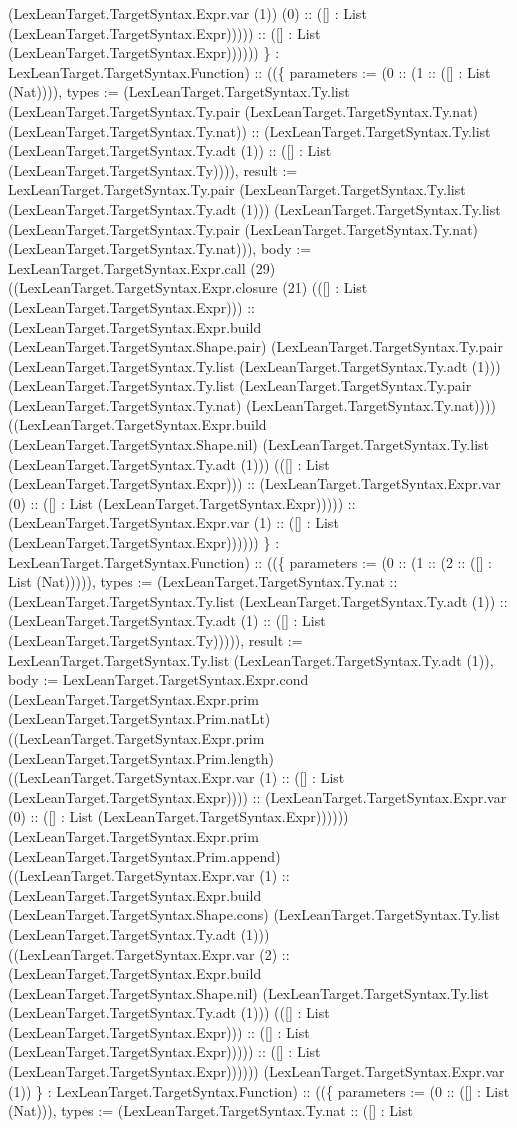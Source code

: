 \documentclass[11pt]{article}
\begin{document}
(LexLeanTarget.TargetSyntax.Expr.var (1)) (0) :: ([] : List (LexLeanTarget.TargetSyntax.Expr))))) :: ([] : List (LexLeanTarget.TargetSyntax.Expr)))))) \} : LexLeanTarget.TargetSyntax.Function) :: ((\{ parameters := (0 :: (1 :: ([] : List (Nat)))), types := (LexLeanTarget.TargetSyntax.Ty.list (LexLeanTarget.TargetSyntax.Ty.pair (LexLeanTarget.TargetSyntax.Ty.nat) (LexLeanTarget.TargetSyntax.Ty.nat)) :: (LexLeanTarget.TargetSyntax.Ty.list (LexLeanTarget.TargetSyntax.Ty.adt (1)) :: ([] : List (LexLeanTarget.TargetSyntax.Ty)))), result := LexLeanTarget.TargetSyntax.Ty.pair (LexLeanTarget.TargetSyntax.Ty.list (LexLeanTarget.TargetSyntax.Ty.adt (1))) (LexLeanTarget.TargetSyntax.Ty.list (LexLeanTarget.TargetSyntax.Ty.pair (LexLeanTarget.TargetSyntax.Ty.nat) (LexLeanTarget.TargetSyntax.Ty.nat))), body := LexLeanTarget.TargetSyntax.Expr.call (29) ((LexLeanTarget.TargetSyntax.Expr.closure (21) (([] : List (LexLeanTarget.TargetSyntax.Expr))) :: (LexLeanTarget.TargetSyntax.Expr.build (LexLeanTarget.TargetSyntax.Shape.pair) (LexLeanTarget.TargetSyntax.Ty.pair (LexLeanTarget.TargetSyntax.Ty.list (LexLeanTarget.TargetSyntax.Ty.adt (1))) (LexLeanTarget.TargetSyntax.Ty.list (LexLeanTarget.TargetSyntax.Ty.pair (LexLeanTarget.TargetSyntax.Ty.nat) (LexLeanTarget.TargetSyntax.Ty.nat)))) ((LexLeanTarget.TargetSyntax.Expr.build (LexLeanTarget.TargetSyntax.Shape.nil) (LexLeanTarget.TargetSyntax.Ty.list (LexLeanTarget.TargetSyntax.Ty.adt (1))) (([] : List (LexLeanTarget.TargetSyntax.Expr))) :: (LexLeanTarget.TargetSyntax.Expr.var (0) :: ([] : List (LexLeanTarget.TargetSyntax.Expr))))) :: (LexLeanTarget.TargetSyntax.Expr.var (1) :: ([] : List (LexLeanTarget.TargetSyntax.Expr)))))) \} : LexLeanTarget.TargetSyntax.Function) :: ((\{ parameters := (0 :: (1 :: (2 :: ([] : List (Nat))))), types := (LexLeanTarget.TargetSyntax.Ty.nat :: (LexLeanTarget.TargetSyntax.Ty.list (LexLeanTarget.TargetSyntax.Ty.adt (1)) :: (LexLeanTarget.TargetSyntax.Ty.adt (1) :: ([] : List (LexLeanTarget.TargetSyntax.Ty))))), result := LexLeanTarget.TargetSyntax.Ty.list (LexLeanTarget.TargetSyntax.Ty.adt (1)), body := LexLeanTarget.TargetSyntax.Expr.cond (LexLeanTarget.TargetSyntax.Expr.prim (LexLeanTarget.TargetSyntax.Prim.natLt) ((LexLeanTarget.TargetSyntax.Expr.prim (LexLeanTarget.TargetSyntax.Prim.length) ((LexLeanTarget.TargetSyntax.Expr.var (1) :: ([] : List (LexLeanTarget.TargetSyntax.Expr)))) :: (LexLeanTarget.TargetSyntax.Expr.var (0) :: ([] : List (LexLeanTarget.TargetSyntax.Expr)))))) (LexLeanTarget.TargetSyntax.Expr.prim (LexLeanTarget.TargetSyntax.Prim.append) ((LexLeanTarget.TargetSyntax.Expr.var (1) :: (LexLeanTarget.TargetSyntax.Expr.build (LexLeanTarget.TargetSyntax.Shape.cons) (LexLeanTarget.TargetSyntax.Ty.list (LexLeanTarget.TargetSyntax.Ty.adt (1))) ((LexLeanTarget.TargetSyntax.Expr.var (2) :: (LexLeanTarget.TargetSyntax.Expr.build (LexLeanTarget.TargetSyntax.Shape.nil) (LexLeanTarget.TargetSyntax.Ty.list (LexLeanTarget.TargetSyntax.Ty.adt (1))) (([] : List (LexLeanTarget.TargetSyntax.Expr))) :: ([] : List (LexLeanTarget.TargetSyntax.Expr))))) :: ([] : List (LexLeanTarget.TargetSyntax.Expr)))))) (LexLeanTarget.TargetSyntax.Expr.var (1)) \} : LexLeanTarget.TargetSyntax.Function) :: ((\{ parameters := (0 :: ([] : List (Nat))), types := (LexLeanTarget.TargetSyntax.Ty.nat :: ([] : List 
\end{document}
